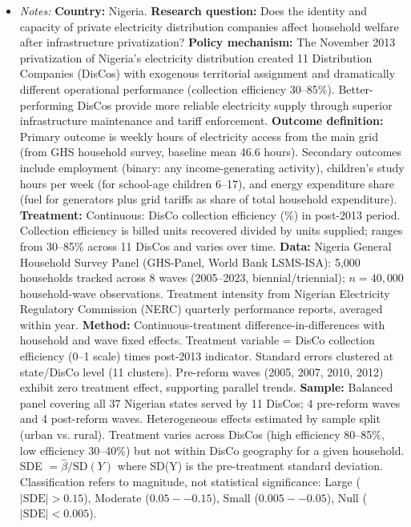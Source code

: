 \begin{table}[h!]
\begin{itemize}
\item \textit{Notes:} \textbf{Country:} Nigeria. \textbf{Research question:} Does the identity and capacity of private electricity distribution companies affect household welfare after infrastructure privatization? \textbf{Policy mechanism:} The November 2013 privatization of Nigeria's electricity distribution created 11 Distribution Companies (DisCos) with exogenous territorial assignment and dramatically different operational performance (collection efficiency 30--85\%). Better-performing DisCos provide more reliable electricity supply through superior infrastructure maintenance and tariff enforcement. \textbf{Outcome definition:} Primary outcome is weekly hours of electricity access from the main grid (from GHS household survey, baseline mean 46.6 hours). Secondary outcomes include employment (binary: any income-generating activity), children's study hours per week (for school-age children 6--17), and energy expenditure share (fuel for generators plus grid tariffs as share of total household expenditure). \textbf{Treatment:} Continuous: DisCo collection efficiency (\%) in post-2013 period. Collection efficiency is billed units recovered divided by units supplied; ranges from 30--85\% across 11 DisCos and varies over time. \textbf{Data:} Nigeria General Household Survey Panel (GHS-Panel, World Bank LSMS-ISA): 5,000 households tracked across 8 waves (2005--2023, biennial/triennial); \(n = 40,000\) household-wave observations. Treatment intensity from Nigerian Electricity Regulatory Commission (NERC) quarterly performance reports, averaged within year. \textbf{Method:} Continuous-treatment difference-in-differences with household and wave fixed effects. Treatment variable = DisCo collection efficiency (0--1 scale) times post-2013 indicator. Standard errors clustered at state/DisCo level (11 clusters). Pre-reform waves (2005, 2007, 2010, 2012) exhibit zero treatment effect, supporting parallel trends. \textbf{Sample:} Balanced panel covering all 37 Nigerian states served by 11 DisCos; 4 pre-reform waves and 4 post-reform waves. Heterogeneous effects estimated by sample split (urban vs. rural). Treatment varies across DisCos (high efficiency 80--85\%, low efficiency 30--40\%) but not within DisCo geography for a given household. SDE \(= \hat{\beta} / \text{SD}(Y)\) where SD(Y) is the pre-treatment standard deviation. Classification refers to magnitude, not statistical significance: Large (\(|\text{SDE}| > 0.15\)), Moderate (\(0.05--0.15\)), Small (\(0.005--0.05\)), Null (\(|\text{SDE}| < 0.005\)).\end{itemize}
\end{table}


